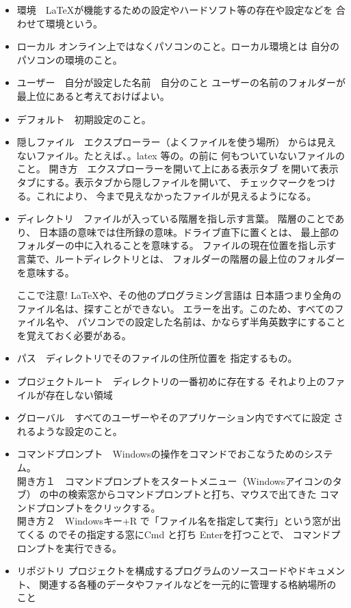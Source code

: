 \documentclass{ltjsarticle}
\begin{document}
\begin{itemize}
  \item 環境　\LaTeX が機能するための設定やハードソフト等の存在や設定などを
        合わせて環境という。
  \item ローカル  オンライン上ではなくパソコンのこと。ローカル環境とは
        自分のパソコンの環境のこと。
  \item ユーザー　自分が設定した名前　自分のこと
        ユーザーの名前のフォルダーが最上位にあると考えておけばよい。
  \item デフォルト　初期設定のこと。
  \item 隠しファイル　エクスプローラー（よくファイルを使う場所）
        からは見えないファイル。たとえば、。latex 等の。の前に
        何もついていないファイルのこと。
        開き方　エクスプローラーを開いて上にある表示タブ
        を開いて表示タブにする。表示タブから隠しファイルを開いて、
        チェックマークをつける。これにより、
        今まで見えなかったファイルが見えるようになる。

  \item ディレクトリ　ファイルが入っている階層を指し示す言葉。
        階層のことであり、
        日本語の意味では住所録の意味。ドライブ直下に置くとは、
        最上部のフォルダーの中に入れることを意味する。
        ファイルの現在位置を指し示す言葉で、ルートディレクトリとは、
        フォルダーの階層の最上位のフォルダーを意味する。


        ここで注意! LaTeXや、その他のプログラミング言語は
        日本語つまり全角のファイル名は、探すことができない。
        エラーを出す。このため、すべてのファイル名や、
        パソコンでの設定した名前は、かならず半角英数字にすること
        を覚えておく必要がある。
  \item パス　ディレクトリでそのファイルの住所位置を
        指定するもの。
  \item プロジェクトルート　ディレクトリの一番初めに存在する
        それより上のファイルが存在しない領域
  \item グローバル　すべてのユーザーやそのアプリケーション内ですべてに設定
        されるような設定のこと。
  \item コマンドプロンプト　Windowsの操作をコマンドでおこなうためのシステム。\\
        開き方１　コマンドプロンプトをスタートメニュー（Windowsアイコンのタブ）
        の中の検索窓からコマンドプロンプトと打ち、マウスで出てきた
        コマンドプロンプトをクリックする。\\
        開き方２　Windowsキー+R で「ファイル名を指定して実行」という窓が出てくる
        のでその指定する窓にCmd と打ち Enterを打つことで、
        コマンドプロンプトを実行できる。
  \item リポジトリ
        プロジェクトを構成するプログラムのソースコードやドキュメント、
         関連する各種のデータやファイルなどを一元的に管理する格納場所のこと

\end{itemize}
\end{document}
